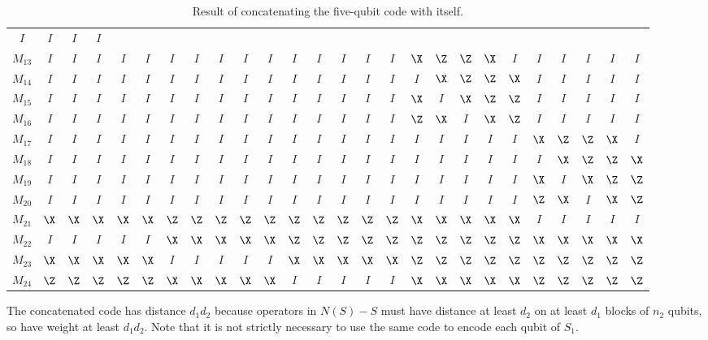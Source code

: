 \begin{table}
{\begin{tabular}{c|ccccc|ccccc|ccccc|ccccc|ccccc}
		$I$ & $I$ & $I$ & $I$ \\
		$M_{13}$ & $I$ & $I$ & $I$ & $I$ & $I$ & $I$ & $I$ & $I$ & $I$ & $I$ & $I$
		& $I$ & $I$ & $I$ & $I$ & $\X$ & $\Z$ & $\Z$ & $\X$ & $I$ & $I$ & $I$ &
		$I$ & $I$ & $I$ \\
		$M_{14}$ & $I$ & $I$ & $I$ & $I$ & $I$ & $I$ & $I$ & $I$ & $I$ & $I$ & $I$
		& $I$ & $I$ & $I$ & $I$ & $I$ & $\X$ & $\Z$ & $\Z$ & $\X$ & $I$ & $I$ &
		$I$ & $I$ & $I$ \\
		$M_{15}$ & $I$ & $I$ & $I$ & $I$ & $I$ & $I$ & $I$ & $I$ & $I$ & $I$ & $I$
		& $I$ & $I$ & $I$ & $I$ & $\X$ & $I$ & $\X$ & $\Z$ & $\Z$ & $I$ & $I$ &
		$I$ & $I$ & $I$ \\
		$M_{16}$ & $I$ & $I$ & $I$ & $I$ & $I$ & $I$ & $I$ & $I$ & $I$ & $I$ & $I$
		& $I$ & $I$ & $I$ & $I$ & $\Z$ & $\X$ & $I$ & $\X$ & $\Z$ & $I$ & $I$ &
		$I$ & $I$ & $I$ \\
		$M_{17}$ & $I$ & $I$ & $I$ & $I$ & $I$ & $I$ & $I$ & $I$ & $I$ & $I$ & $I$
		& $I$ & $I$ & $I$ & $I$ & $I$ & $I$ & $I$ & $I$ & $I$ & $\X$ & $\Z$ &
		$\Z$ & $\X$ & $I$ \\
		$M_{18}$ & $I$ & $I$ & $I$ & $I$ & $I$ & $I$ & $I$ & $I$ & $I$ & $I$ & $I$
		& $I$ & $I$ & $I$ & $I$ & $I$ & $I$ & $I$ & $I$ & $I$ & $I$ & $\X$ & $\Z$
		& $\Z$ & $\X$ \\
		$M_{19}$ & $I$ & $I$ & $I$ & $I$ & $I$ & $I$ & $I$ & $I$ & $I$ & $I$ & $I$
		& $I$ & $I$ & $I$ & $I$ & $I$ & $I$ & $I$ & $I$ & $I$ & $\X$ & $I$ &
		$\X$ & $\Z$ & $\Z$ \\
		$M_{20}$ & $I$ & $I$ & $I$ & $I$ & $I$ & $I$ & $I$ & $I$ & $I$ & $I$ & $I$
		& $I$ & $I$ & $I$ & $I$ & $I$ & $I$ & $I$ & $I$ & $I$ & $\Z$ & $\X$ & $I$
		& $\X$ & $\Z$ \\
		$M_{21}$ & $\X$ & $\X$ & $\X$ & $\X$ & $\X$ & $\Z$ & $\Z$ & $\Z$ & $\Z$
		& $\Z$ & $\Z$ & $\Z$ & $\Z$ & $\Z$ & $\Z$ & $\X$ & $\X$ & $\X$ & $\X$ &
		$\X$ & $I$ & $I$ & $I$ & $I$ & $I$ \\
		$M_{22}$ & $I$ & $I$ & $I$ & $I$ & $I$ & $\X$ & $\X$ & $\X$ & $\X$ &
		$\X$ & $\Z$ & $\Z$ & $\Z$ & $\Z$ & $\Z$ & $\Z$ & $\Z$ & $\Z$ & $\Z$ &
		$\Z$ & $\X$ & $\X$ & $\X$ & $\X$ & $\X$ \\
		$M_{23}$ & $\X$ & $\X$ & $\X$ & $\X$ & $\X$ & $I$ & $I$ & $I$ & $I$ &
		$I$ & $\X$ & $\X$ & $\X$ & $\X$ & $\X$ & $\Z$ & $\Z$ & $\Z$ & $\Z$ &
		$\Z$ & $\Z$ & $\Z$ & $\Z$ & $\Z$ & $\Z$ \\
		$M_{24}$ & $\Z$ & $\Z$ & $\Z$ & $\Z$ & $\Z$ & $\X$ & $\X$ & $\X$ & $\X$
		& $\X$ & $I$ & $I$ & $I$ & $I$ & $I$ & $\X$ & $\X$ & $\X$ & $\X$ & $\X$
		& $\Z$ & $\Z$ & $\Z$ & $\Z$ & $\Z$
	\end{tabular}
	\caption{Result of concatenating the five-qubit code with itself.}
	\label{table-25qubit}}
\end{table}
The concatenated code has distance $d_1 d_2$ because operators in $N(S) -
S$ must have distance at least $d_2$ on at least $d_1$ blocks of $n_2$
qubits, so have weight at least $d_1 d_2$.  Note that it is not strictly
necessary to use the same code to encode each qubit of $S_1$.

